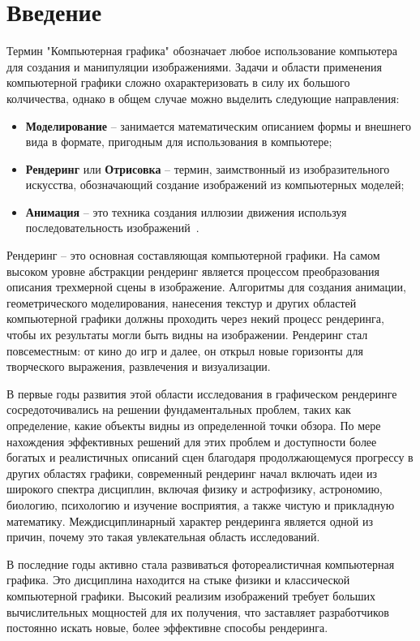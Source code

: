 \chapter*{Введение}

Термин "Компьютерная графика" обозначает любое использование компьютера для создания 
и манипуляции изображениями. Задачи и области применения компьютерной графики 
сложно охарактеризовать в силу их большого колчичества, однако в общем случае можно выделить 
следующие направления:
\begin{itemize}[label*=---]
    \item \textbf{Моделирование} -- занимается математическим описанием формы и внешнего вида
в формате, пригодным для использования в компьютере;
    \item \textbf{Рендеринг} или \textbf{Отрисовка} -- термин, заимствонный из изобразительного 
искусства, обозначающий создание изображений из компьютерных моделей;
    \item \textbf{Анимация} -- это техника создания иллюзии движения используя последовательность изображений~\cite{FoCG}.
\end{itemize}

Рендеринг -- это основная составляющая компьютерной графики. 
На самом высоком уровне абстракции рендеринг является процессом 
преобразования описания трехмерной сцены в изображение. Алгоритмы для создания 
анимации, геометрического моделирования, нанесения текстур и других областей 
компьютерной графики должны проходить через некий процесс рендеринга, 
чтобы их результаты могли быть видны на изображении. Рендеринг стал 
повсеместным: от кино до игр и далее, он открыл новые горизонты для 
творческого выражения, развлечения и визуализации.

В первые годы развития этой области исследования в графическом рендеринге 
сосредоточивались на решении фундаментальных проблем, таких как определение, 
какие объекты видны из определенной точки обзора. По мере нахождения 
эффективных решений для этих проблем и доступности более богатых и 
реалистичных описаний сцен благодаря продолжающемуся прогрессу в других 
областях графики, современный рендеринг начал включать идеи из широкого 
спектра дисциплин, включая физику и астрофизику, астрономию, биологию, 
психологию и изучение восприятия, а также чистую и прикладную математику. 
Междисциплинарный характер рендеринга является одной из причин, почему 
это такая увлекательная область исследований.

В последние годы активно стала развиваться фотореалистичная компьютерная 
графика. Это дисциплина находится на стыке физики и классической 
компьютерной графики. Высокий реализим изображений требует больших 
вычислительных мощностей для их получения, что заставляет разработчиков 
постоянно искать новые, более эффективне способы рендеринга.

